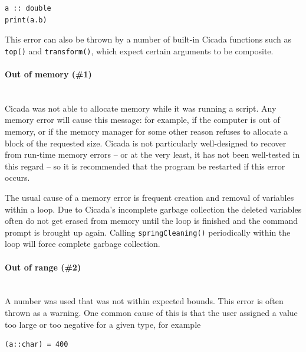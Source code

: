 \documentclass{article}
\newenvironment{code}{
       \begin{list}{}{
               \setlength{\leftmargin}{.4in}
               \setlength{\rightmargin}{0in}
               \setlength{\topsep}{.2in}
       }
       \small
       \item[] }
       { \end{list}   }
\begin{document}
\begin{code} \begin{verbatim}
a :: double
print(a.b)
\end{verbatim} \end{code}

\noindent This error can also be thrown by a number of built-in Cicada functions such as \verb#top()# and \verb#transform()#, which expect certain arguments to be composite.\\




\paragraph{Out of memory (\#1)\\\\}

Cicada was not able to allocate memory while it was running a script.  Any memory error will cause this message:  for example, if the computer is out of memory, or if the memory manager for some other reason refuses to allocate a block of the requested size.  Cicada is not particularly well-designed to recover from run-time memory errors -- or at the very least, it has not been well-tested in this regard -- so it is recommended that the program be restarted if this error occurs.

The usual cause of a memory error is frequent creation and removal of variables within a loop.  Due to Cicada's incomplete garbage collection the deleted variables often do not get erased from memory until the loop is finished and the command prompt is brought up again.  Calling \verb#springCleaning()# periodically within the loop will force complete garbage collection.\\




\paragraph{Out of range (\#2)\\\\}

A number was used that was not within expected bounds.  This error is often thrown as a warning.  One common cause of this is that the user assigned a value too large or too negative for a given type, for example

\begin{code} \begin{verbatim}
(a::char) = 400
\end{verbatim} \end{code}
\end{document}
